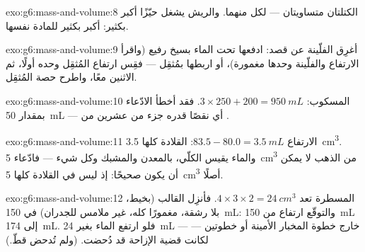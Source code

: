 \begin{solution}{exo:g6:mass-and-volume:8}
الكتلتان متساويتان ---  لكل منهما. والريش يشغل حيّزًا
أكبر بكثير:  أكبر بكثير للمادة نفسها.
\end{solution}

\begin{solution}{exo:g6:mass-and-volume:9}
أغرِق الفلّينة عن قصد: ادفعها تحت الماء بسيخ رفيع (واقرأ
الارتفاع والفلّينة وحدها مغمورة)، أو اربطها بمُثقِل ---
فقِس ارتفاع المُثقِل وحده أولًا، ثم الاثنين معًا، واطرح حصة
المُثقِل.
\end{solution}

\begin{solution}{exo:g6:mass-and-volume:10}
المسكوب: $3 \times 250 + 200 = \qty{950}{mL}$. فقد أخطأ
الادّعاء بمقدار \qty{50}{mL} --- أي نقصًا قدره جزء من عشرين من
.
\end{solution}

\begin{solution}{exo:g6:mass-and-volume:11}
الارتفاع $83.5 - 80.0 = \qty{3.5}{mL}$:  القلادة كلها
\qty{3.5}{cm^3}. والماء يقيس  الكلّي، بالمعدن والمشبك وكل
شيء --- فادّعاء \qty{5}{cm^3} من الذهب لا يمكن أن يكون صحيحًا:
إذ ليس في القلادة كلها \qty{5}{cm^3} أصلًا.
\end{solution}

\begin{solution}{exo:g6:mass-and-volume:12}
المسطرة تعد  $4 \times 3 \times 2 = \qty{24}{cm^3}$. فأنزِل
القالب (بخيط، بلا رشقة، مغمورًا كله، غير ملامس للجدران) في
\qty{150}{mL}: والتوقّع ارتفاع من \qty{150}{mL} إلى
\qty{174}{mL}. فلو ارتفع الماء بغير \qty{24}{mL} --- خارج خطوة
المخبار الأمينة أو خطوتين --- لكانت قضية الإزاحة قد دُحضت. (ولم
تُدحض قطّ.)
\end{solution}

